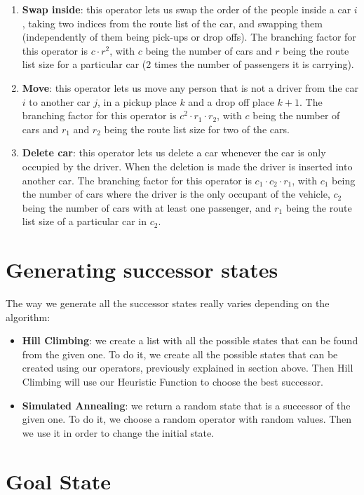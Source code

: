 \documentclass[12]{article}
\begin{document}
\begin{enumerate}
  \item \textbf{Swap inside}: this operator lets us swap the order of the people inside a car $i$, 
  taking two indices from the route list of the car, and swapping them (independently of them being pick-ups or drop offs).
  The branching factor for this operator is $c \cdot r^2$, with $c$ being the number of cars and $r$ being the route list size for a particular car (2 times the number of passengers it is carrying).
  \item \textbf{Move}: this operator lets us move any person that is not a driver from the car $i$ to another car $j$, in a pickup place $k$ and a drop off place $k+1$.  
  The branching factor for this operator is $c^2 \cdot r_1 \cdot r_2$, with $c$ being the number of cars and $r_1$ and $r_2$ being the route list size for two of the cars.
  \item \textbf{Delete car}: this operator lets us delete a car whenever the car is only occupied by the driver. When the deletion is made the driver is inserted into another car. 
  The branching factor for this operator is $c_1 \cdot c_2 \cdot r_1$, with $c_1$ being the number of cars where the driver is the only occupant of the vehicle, $c_2$ being the number of cars with at least one passenger, and $r_1$ being the route list size of a particular car in $c_2$. 
\end{enumerate}

\section{Generating successor states}
The way we generate all the successor states really varies depending on the algorithm:
\begin{itemize}
\item \textbf{Hill Climbing}: we create a list with all the possible states that can be found from the given one. To do it, we create all the possible states that can be created using our operators, previously explained in section above. Then Hill Climbing will use our Heuristic Function to choose the best successor.
\item \textbf{Simulated Annealing}: we return a random state that is a successor of the given one. To do it, we choose a random operator with random values. Then we use it in order to change the initial state.  
\end{itemize}

\section{Goal State}
\end{document}
